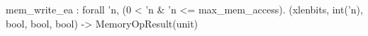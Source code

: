 mem_write_ea : forall 'n, (0 < 'n & 'n <= max_mem_access). (xlenbits, int('n), bool, bool, bool) -> MemoryOpResult(unit)